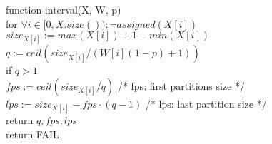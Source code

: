 function interval(X, W, p) \\
\indent for $\forall i \in [0, X.size()): \lnot assigned(X[i])$ \\
\indent \indent $size_{X[i]} := max(X[i])+1-min(X[i])$ \\
\indent \indent $q := ceil(size_{X[i]}/(W[i](1 - p) + 1))$ \\
\indent \indent if $q > 1$ \\
\indent \indent \indent $fps := ceil(size_{X[i]}/q)$ /* fps: first partitions size */\\
\indent \indent \indent $lps := size_{X[i]} - fps \cdot (q-1)$ /* lps: last partition size */\\
\indent \indent \indent return $q, fps, lps$\\
\indent return FAIL\\
